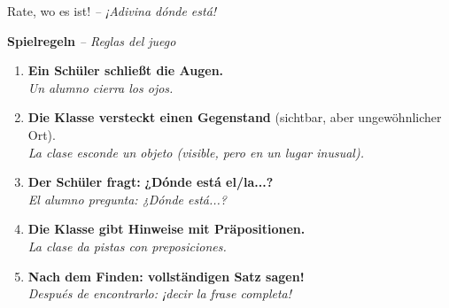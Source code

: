 \documentclass[11pt, a4paper]{article}
\newcommand{\seriftext}[1]{{\fontfamily{ppl}\selectfont #1}}
\newcommand{\estar}[1]{\seriftext{\textbf{\textcolor{blau}{#1}}}}
\newcommand{\de}[1]{{\small\textcolor{dunkelgrau}{\textit{#1}}}}
\begin{document}
\begin{center}
\end{center}

\vspace{-4pt}

\begin{center}
{\large Rate, wo es ist! \de{-- ¡Adivina dónde está!}}
\end{center}

\vspace{6pt}


\begin{regelbox}
\textbf{\large Spielregeln} \de{-- Reglas del juego}

\vspace{6pt}

\begin{enumerate}[leftmargin=2em, itemsep=4pt]
    \item \textbf{Ein Schüler schließt die Augen.}\\
    \de{Un alumno cierra los ojos.}

    \item \textbf{Die Klasse versteckt einen Gegenstand} (sichtbar, aber ungewöhnlicher Ort).\\
    \de{La clase esconde un objeto (visible, pero en un lugar inusual).}

    \item \textbf{Der Schüler fragt:} \estar{¿Dónde está el/la...?}\\
    \de{El alumno pregunta: ¿Dónde está...?}

    \item \textbf{Die Klasse gibt Hinweise mit Präpositionen.}\\
    \de{La clase da pistas con preposiciones.}

    \item \textbf{Nach dem Finden: vollständigen Satz sagen!}\\
    \de{Después de encontrarlo: ¡decir la frase completa!}
\end{enumerate}
\end{regelbox}
\end{document}
